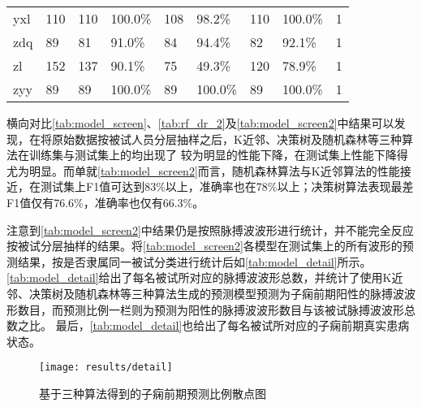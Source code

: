 \begin{landscape}
\begin{longtable}{m{2cm}<{\centering}m{2cm}<{\centering}m{2cm}<{\centering}m{2cm}<{\centering}m{2cm}<{\centering}m{2cm}<{\centering}m{2cm}<{\centering}m{2cm}<{\centering}m{2cm}<{\centering}}
            yxl                   & 110                   & 110        & 100.0\%    & 108        & 98.2\%     & 110        & 100.0\%     & 1                                                                      \\
            zdq                   & 89                    & 81         & 91.0\%     & 84         & 94.4\%     & 82         & 92.1\%      & 1                                                                      \\
            zl                    & 152                   & 137        & 90.1\%     & 75         & 49.3\%     & 120        & 78.9\%      & 1                                                                      \\
            zyy                   & 89                    & 89         & 100.0\%    & 89         & 100.0\%    & 89         & 100.0\%     & 1                                                                       \\    
      \end{longtable}
\end{landscape}


横向对比\autoref{tab:model_screen}、\autoref{tab:rf_dr_2}及\autoref{tab:model_screen2}中结果可以发现，在将原始数据按被试人员分层抽样之后，K近邻、决策树及随机森林等三种算法在训练集与测试集上的均出现了
较为明显的性能下降，在测试集上性能下降得尤为明显。而单就\autoref{tab:model_screen2}而言，随机森林算法与K近邻算法的性能接近，在测试集上F1值可达到83\%以上，准确率也在78\%以上；决策树算法表现最差F1值仅有76.6\%，准确率也仅有66.3\%。

注意到\autoref{tab:model_screen2}中结果仍是按照脉搏波波形进行统计，并不能完全反应按被试分层抽样的结果。将\autoref{tab:model_screen2}各模型在测试集上的所有波形的预测结果，按是否隶属同一被试分类进行统计后如\autoref{tab:model_detail}所示。
\autoref{tab:model_detail}给出了每名被试所对应的脉搏波波形总数，并统计了使用K近邻、决策树及随机森林等三种算法生成的预测模型预测为子痫前期阳性的脉搏波波形数目，而预测比例一栏则为预测为阳性的脉搏波波形数目与该被试脉搏波波形总数之比。
最后，\autoref{tab:model_detail}也给出了每名被试所对应的子痫前期真实患病状态。

\begin{figure}[htbp]
      \centering
      \texttt{[image: results/detail]}
      \caption[基于三种算法得到的子痫前期预测比例散点图]{\label{fig:model_detail}基于三种算法得到的子痫前期预测比例散点图}
\end{figure}

